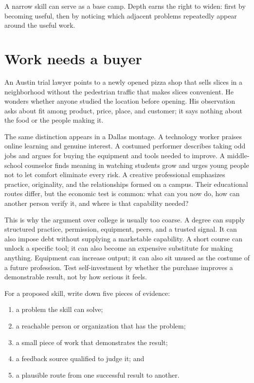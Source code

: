 A narrow skill can serve as a base camp. Depth earns the right to widen: first
by becoming useful, then by noticing which
adjacent problems repeatedly appear around the useful work.

\section{Work needs a buyer}

An Austin trial lawyer points to a newly opened pizza shop that sells slices in
a neighborhood without the pedestrian traffic that makes slices convenient.
He wonders whether anyone studied the location before opening. His observation
asks about fit among product, price, place, and customer; it says nothing about
the food or the people making it.

The same distinction appears in a Dallas montage. A technology worker praises
online learning and genuine interest. A costumed performer describes taking
odd jobs and argues for buying the equipment and tools needed to improve. A
middle-school counselor finds meaning in watching students grow and urges
young people not to let comfort eliminate every risk. A creative professional
emphasizes practice, originality, and the relationships formed on a campus.
Their educational routes differ, but the economic test is common: what can you
now do, how can another person verify it, and where is that capability needed?

This is why the argument over college is usually too coarse. A degree can
supply structured practice, permission, equipment, peers, and a trusted signal.
It can also impose debt without supplying a marketable capability. A short
course can unlock a specific tool; it can also become an expensive substitute
for making anything. Equipment can increase output; it can also sit unused as
the costume of a future profession. Test self-investment by whether the
purchase improves a demonstrable result, not by how serious it feels.

For a proposed skill, write down five pieces of evidence:

\begin{enumerate}
\item a problem the skill can solve;
\item a reachable person or organization that has the problem;
\item a small piece of work that demonstrates the result;
\item a feedback source qualified to judge it; and
\item a plausible route from one successful result to another.
\end{enumerate}

